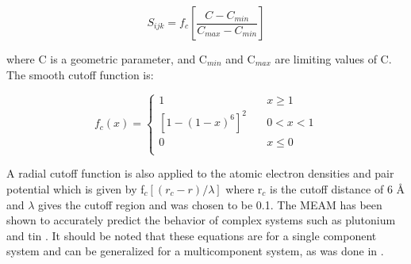 \documentclass[review]{elsarticle}
\begin{document}
\begin{equation}
\label{eq:eqn15}
S_{ijk}= f_{c}\left[\frac{C-C_{min}}{C_{max}-C_{min}}\right]
\end{equation}

where C is a geometric parameter, and C$_{min}$ and C$_{max}$ are limiting values of C.  The smooth cutoff function is:

\begin{equation}
\label{eq:eqn16}
f_{c}(x) = \begin{cases}
    1       & \quad x \geq 1 \\
    [1-(1-x)^{6}]^{2}  & \quad 0 < x < 1\\
    0       & \quad x \leq 0\\
  \end{cases} 
\end{equation}

A radial cutoff function is also applied to the atomic electron densities and pair potential which is given by f$_{c}[(r_{c}-r)/\lambda]$ where r$_{c}$ is the cutoff distance of 6 {\AA } and $\lambda$ gives the cutoff region and was chosen to be 0.1.  The MEAM has been shown to accurately predict the behavior of complex systems such as plutonium \cite{baskes2000} and tin \cite{baskes1997}.  It should be noted that these equations are for a single component system and can be generalized for a multicomponent system, as was done in \cite{baskes2014}.  
\end{document}
